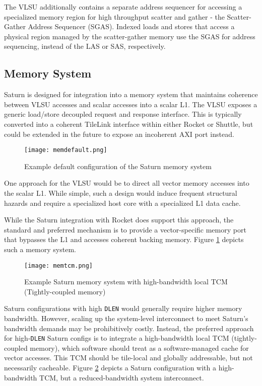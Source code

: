 The VLSU additionally contains a separate address sequencer for accessing a specialized memory region for high throughput scatter and gather - the Scatter-Gather Address Sequencer (SGAS).
Indexed loads and stores that access a physical region managed by the scatter-gather memory use the SGAS for address sequencing, instead of the LAS or SAS, respectively.

\subsection{Memory System}

Saturn is designed for integration into a memory system that maintains coherence between VLSU accesses and scalar accesses into a scalar L1.
The VLSU exposes a generic load/store decoupled request and response interface.
This is typically converted into a coherent TileLink interface within either Rocket or Shuttle, but could be extended in the future to expose an incoherent AXI port instead.

\begin{figure}[h]
  \centering
  \texttt{[image: memdefault.png]}
  \caption{Example default configuration of the Saturn memory system}
  \label{fig:mem-default}
\end{figure}

One approach for the VLSU would be to direct all vector memory accesses into the scalar L1.
While simple, such a design would induce frequent structural hazards and require a specialized host core with a specialized L1 data cache.

While the Saturn integration with Rocket does support this approach, the standard and preferred mechanism is to provide a vector-specific memory port that bypasses the L1 and accesses coherent backing memory.
Figure \ref{fig:mem-default} depicts such a memory system.


\begin{figure}[h]
  \centering
  \texttt{[image: memtcm.png]}
  \caption{Example Saturn memory system with high-bandwidth local TCM (Tightly-coupled memory)}
  \label{fig:mem-tcm}
\end{figure}

Saturn configurations with high \texttt{DLEN} would generally require higher memory bandwidth.
However, scaling up the system-level interconnect to meet Saturn's bandwidth demands may be prohibitively costly.
Instead, the preferred approach for high-\texttt{DLEN} Saturn configs is to integrate a high-bandwidth local TCM (tightly-coupled memory), which software should treat as a software-managed cache for vector accesses.
This TCM should be tile-local and globally addressable, but not necessarily cacheable.
Figure \ref{fig:mem-tcm} depicts a Saturn configuration with a high-bandwidth TCM, but a reduced-bandwidth system interconnect.

